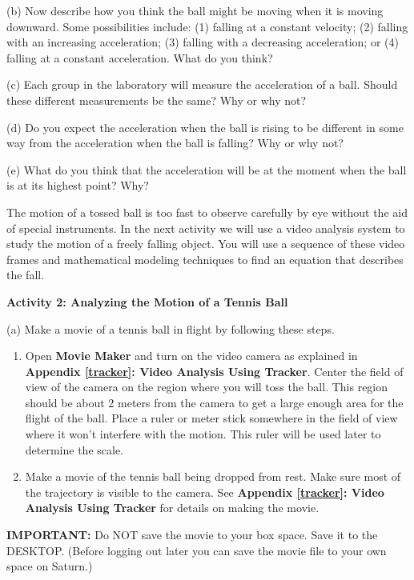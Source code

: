 (b) Now describe how you think the ball might be moving when it is moving downward. Some possibilities include: (1) falling at a constant velocity; (2) falling
with an increasing acceleration; (3) falling with a decreasing acceleration;
or (4) falling at a constant acceleration. What do you think?
\vspace{20mm}

\newpage
(c) Each group in the laboratory will measure the acceleration of a ball. Should these different measurements be the same? Why or why not?
\vspace{20mm}

(d) Do you expect the acceleration when the ball is rising to be different in
some way from the acceleration when the ball is falling? Why or why not?
\vspace{20mm}

(e) What do you think that the acceleration will be at the moment when the ball
is at its highest point? Why?
\vspace{20mm}

The motion of a tossed ball is too fast to observe carefully by eye without
the aid of special instruments. In the next activity we will use a video analysis system to study the motion of a freely falling object. You will use a sequence of these video frames and mathematical modeling techniques to find an equation that describes the fall. 

\textbf{Activity 2: Analyzing the Motion of a Tennis Ball} 

(a) Make a movie of a tennis ball in flight by following these steps.

\begin{enumerate}
\item Open \textbf{Movie Maker} and turn on the video camera as explained in \textbf{Appendix \ref{tracker}: Video Analysis Using Tracker}. Center the field of view of the camera on the region where you will toss the ball. This region should be about 2 meters from the camera to get a large enough area for the flight of the ball. Place a ruler or meter stick somewhere in the field of view where it won't interfere with the motion. This ruler will be used later to determine the scale. 
\item Make a movie of the tennis ball being dropped from rest. Make sure most of the trajectory is visible to the camera. See \textbf{Appendix \ref{tracker}: Video Analysis Using Tracker} for 
details on making the movie.
\end{enumerate}
\textbf{IMPORTANT:} Do NOT save the movie to your box space.  Save it to the DESKTOP.  (Before logging out later you can save the movie file to your own space on Saturn.)
\vspace{5mm}

